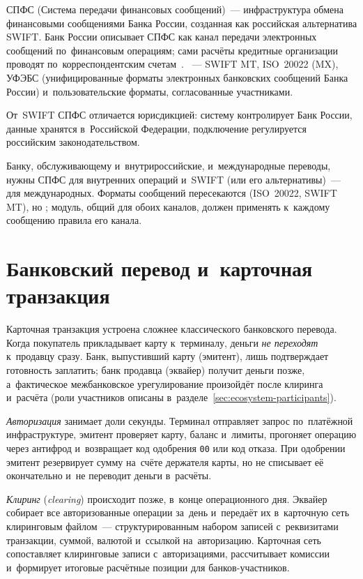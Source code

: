 СПФС (Система передачи финансовых сообщений)~--- инфраструктура обмена
финансовыми сообщениями Банка России, созданная как российская альтернатива
SWIFT. Банк России описывает СПФС как канал передачи электронных сообщений
по~финансовым операциям; сами расчёты кредитные организации проводят
по~корреспондентским счетам~\cite{cbr-spfs}. ~--- SWIFT MT, ISO~20022 (MX), УФЭБС
(унифицированные форматы электронных банковских сообщений Банка России)
и~пользовательские форматы, согласованные участниками.

От~SWIFT СПФС отличается юрисдикцией: систему контролирует Банк России,
данные хранятся в~Российской Федерации, подключение регулируется российским
законодательством.

Банку, обслуживающему и~внутрироссийские, и~международные переводы, нужны СПФС для внутренних операций и~SWIFT (или его альтернативы)~--- для
международных. Форматы сообщений пересекаются (ISO~20022, SWIFT MT), но
; модуль, общий для обоих каналов, должен применять
к~каждому сообщению правила его канала.

\section{Банковский перевод и~карточная транзакция}\label{sec:banks-transfer-vs-card}

Карточная транзакция устроена сложнее классического банковского перевода. Когда
покупатель прикладывает карту к~терминалу, деньги \emph{не переходят}
к~продавцу сразу. Банк, выпустивший карту (эмитент), лишь подтверждает
готовность заплатить; банк продавца (эквайер) получит деньги позже,
а~фактическое межбанковское урегулирование произойдёт после клиринга и~расчёта
(роли участников описаны в~разделе~\ref{sec:ecosystem-participants}).

\textit{Авторизация} занимает доли секунды. Терминал отправляет запрос
по~платёжной инфраструктуре, эмитент проверяет карту, баланс и~лимиты, прогоняет операцию через антифрод
и~возвращает код одобрения \texttt{00} или код отказа. При одобрении эмитент
резервирует
сумму на~счёте держателя карты, но не списывает её окончательно и~не переводит
деньги в~расчёты.

\textit{Клиринг} (\textit{clearing}) происходит позже, в~конце операционного дня.
Эквайер собирает все авторизованные операции за~день и~передаёт их в~карточную
сеть клиринговым файлом~--- структурированным набором записей с~реквизитами
транзакции, суммой, валютой и~ссылкой на~авторизацию. Карточная сеть
сопоставляет клиринговые записи с~авторизациями, рассчитывает комиссии
и~формирует итоговые расчётные позиции для банков-участников.

